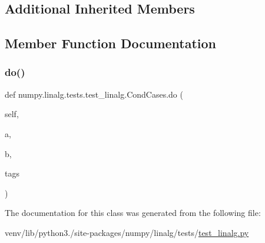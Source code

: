 \subsection*{Additional Inherited Members}


\subsection{Member Function Documentation}
\mbox{\label{classnumpy_1_1linalg_1_1tests_1_1test__linalg_1_1CondCases_aef8829dcd780e17e13593b49a2ff3a2f}} 
\subsubsection{\texorpdfstring{do()}{do()}}
{\footnotesize\ttfamily def numpy.\+linalg.\+tests.\+test\+\_\+linalg.\+Cond\+Cases.\+do (\begin{DoxyParamCaption}\item[{}]{self,  }\item[{}]{a,  }\item[{}]{b,  }\item[{}]{tags }\end{DoxyParamCaption})}



The documentation for this class was generated from the following file\+:\begin{DoxyCompactItemize}
\item 
venv/lib/python3./site-\/packages/numpy/linalg/tests/\hyperlink{test__linalg_8py}{test\+\_\+linalg.\+py}\end{DoxyCompactItemize}
